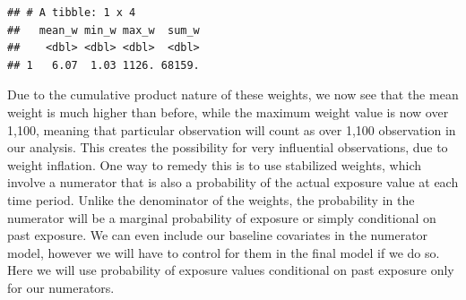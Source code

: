 \documentclass[
]{book}
\newenvironment{Shaded}{\begin{snugshade}}{\end{snugshade}}
\newcommand{\CommentTok}[1]{\textcolor[rgb]{0.56,0.35,0.01}{\textit{#1}}}
\newcommand{\DataTypeTok}[1]{\textcolor[rgb]{0.13,0.29,0.53}{#1}}
\newcommand{\DecValTok}[1]{\textcolor[rgb]{0.00,0.00,0.81}{#1}}
\newcommand{\KeywordTok}[1]{\textcolor[rgb]{0.13,0.29,0.53}{\textbf{#1}}}
\newcommand{\NormalTok}[1]{#1}
\newcommand{\OperatorTok}[1]{\textcolor[rgb]{0.81,0.36,0.00}{\textbf{#1}}}
\newcommand{\StringTok}[1]{\textcolor[rgb]{0.31,0.60,0.02}{#1}}
\begin{document}
\begin{Shaded}
\end{Shaded}

\begin{verbatim}
## # A tibble: 1 x 4
##   mean_w min_w max_w  sum_w
##    <dbl> <dbl> <dbl>  <dbl>
## 1   6.07  1.03 1126. 68159.
\end{verbatim}

Due to the cumulative product nature of these weights, we now see that the mean weight is much higher than before, while the maximum weight value is now over 1,100, meaning that particular observation will count as over 1,100 observation in our analysis. This creates the possibility for very influential observations, due to weight inflation. One way to remedy this is to use stabilized weights, which involve a numerator that is also a probability of the actual exposure value at each time period. Unlike the denominator of the weights, the probability in the numerator will be a marginal probability of exposure or simply conditional on past exposure. We can even include our baseline covariates in the numerator model, however we will have to control for them in the final model if we do so. Here we will use probability of exposure values conditional on past exposure only for our numerators.
\end{document}
